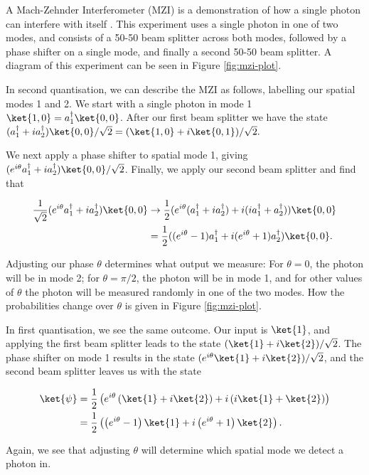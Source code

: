 A Mach-Zehnder Interferometer (MZI) is a demonstration of how a single photon can interfere with itself \cite{zehnder1891,mach1892}. This experiment uses a single photon in one of two modes, and consists of a 50-50 beam splitter across both modes, followed by a phase shifter on a single mode, and finally a second 50-50 beam splitter. A diagram of this experiment can be seen in Figure \ref{fig:mzi-plot}.

In second quantisation, we can describe the MZI as follows, labelling our spatial modes 1 and 2. We start with a single photon in mode 1 $\ket{1,0} = a_1^\dagger\ket{0,0}$. After our first beam splitter we have the state $(a_1^\dagger + ia_2^\dagger)\ket{0,0}/\sqrt{2} = (\ket{1,0}+i\ket{0,1})/\sqrt{2}.$

We next apply a phase shifter to spatial mode 1, giving $(e^{i\theta}a_1^\dagger + ia_2^\dagger)\ket{0,0}/\sqrt{2}$. Finally, we apply our second beam splitter and find that

\begin{align}
\frac{1}{\sqrt{2}}(e^{i\theta}a_1^\dagger + ia_2^\dagger)\ket{0,0} &\rightarrow \frac{1}{2}(e^{i\theta}(a_1^\dagger+ia_2^\dagger) + i(ia_1^\dagger + a_2^\dagger))\ket{0,0}\\
&= \frac{1}{2}((e^{i\theta}-1)a_1^\dagger+i(e^{i\theta}+1)a_2^\dagger)\ket{0,0}.
\end{align}

Adjusting our phase $\theta$ determines what output we measure: For $\theta=0$, the photon will be in mode 2; for $\theta=\pi/2$, the photon will be in mode 1, and for other values of $\theta$ the photon will be measured randomly in one of the two modes. How the probabilities change over $\theta$ is given in Figure \ref{fig:mzi-plot}.

In first quantisation, we see the same outcome. Our input is $\ket{1}$, and  applying the first beam splitter leads to the state $(\ket{1}+i\ket{2})/\sqrt{2}$. The phase shifter on mode 1 results in the state $(e^{i\theta}\ket{1}+i\ket{2})/\sqrt{2}$, and the second beam splitter leaves us with the state

\begin{align}
\ket{\psi} &= \frac{1}{2}\left(e^{i\theta}\left(\ket{1} + i\ket{2}\right) + i\left(i\ket{1} + \ket{2}\right)\right)\\
&= \frac{1}{2}\left(\left(e^{i\theta}-1\right)\ket{1} + i\left(e^{i\theta}+1\right)\ket{2}\right).
\end{align}

Again, we see that adjusting $\theta$ will determine which spatial mode we detect a photon in.

